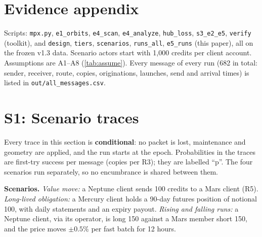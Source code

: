 \clearpage
\appendix
\section*{Evidence appendix}
\small
Scripts: \texttt{mpx.py}, \texttt{e1\_orbits}, \texttt{e4\_scan}, \texttt{e4\_analyze}, \texttt{hub\_loss}, \texttt{s3\_e2\_e5}, \texttt{verify} (toolkit), and \texttt{design}, \texttt{tiers}, \texttt{scenarios}, \texttt{runs\_all}, \texttt{e5\_runs} (this paper), all on the frozen v1.3 data. Scenario actors start with 1{,}000 credits per client account. Assumptions are A1--A8 (\cref{tab:assume}). Every message of every run (682 in total: sender, receiver, route, copies, originations, launches, send and arrival times) is listed in \texttt{out/all\_messages.csv}.

\section{S1: Scenario traces}\label{app:s1}
Every trace in this section is \textbf{conditional}: no packet is lost, maintenance and geometry are applied, and the run starts at the epoch. Probabilities in the traces are first-try success per message (copies per R3); they are labelled ``p''. The four scenarios run separately, so no encumbrance is shared between them.

\textbf{Scenarios.} \emph{Value move:} a Neptune client sends 100 credits to a Mars client (R5). \emph{Long-lived obligation:} a Mercury client holds a 90-day futures position of notional 100, with daily statements and an expiry payout. \emph{Rising and falling runs:} a Neptune client, via its operator, is long 150 against a Mars member short 150, and the price moves $\pm0.5\%$ per fast batch for 12 hours.

